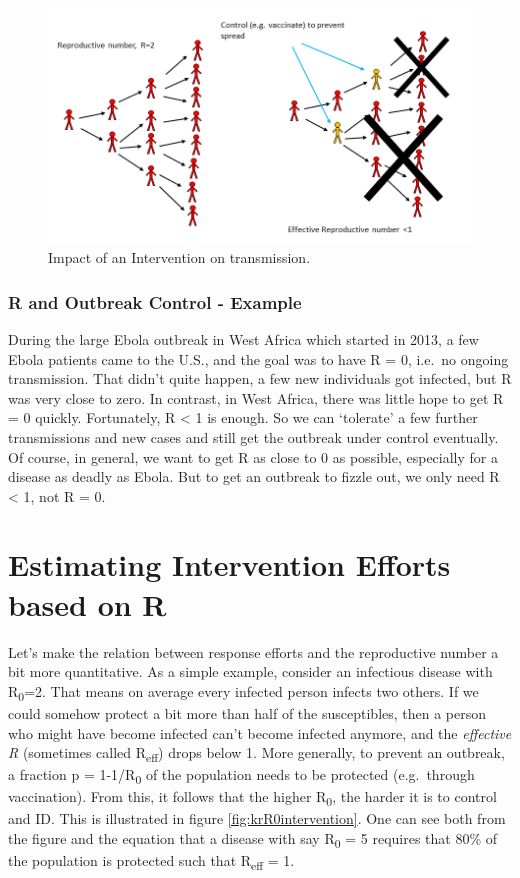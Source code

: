 \documentclass[]{book}
\theoremstyle{definition}
\theoremstyle{definition}
\theoremstyle{definition}
\theoremstyle{remark}
\begin{document}
\begin{figure}
\centering
\includegraphics{./images/R0intervention.png}
\caption{\label{fig:R0intervention}Impact of an Intervention on
transmission.}
\end{figure}

\subsubsection{R and Outbreak Control - Example}\label{myexamplebox}

During the large Ebola outbreak in West Africa which started in 2013, a
few Ebola patients came to the U.S., and the goal was to have R = 0,
i.e.~no ongoing transmission. That didn't quite happen, a few new
individuals got infected, but R was very close to zero. In contrast, in
West Africa, there was little hope to get R = 0 quickly. Fortunately, R
\textless{} 1 is enough. So we can `tolerate' a few further
transmissions and new cases and still get the outbreak under control
eventually. Of course, in general, we want to get R as close to 0 as
possible, especially for a disease as deadly as Ebola. But to get an
outbreak to fizzle out, we only need R \textless{} 1, not R = 0.

\section{Estimating Intervention Efforts based on
R}\label{estimating-intervention-efforts-based-on-r}

Let's make the relation between response efforts and the reproductive
number a bit more quantitative. As a simple example, consider an
infectious disease with R\textsubscript{0}=2. That means on average
every infected person infects two others. If we could somehow protect a
bit more than half of the susceptibles, then a person who might have
become infected can't become infected anymore, and the \emph{effective
R} (sometimes called R\textsubscript{eff}) drops below 1. More
generally, to prevent an outbreak, a fraction p = 1-1/R\textsubscript{0}
of the population needs to be protected (e.g.~through vaccination). From
this, it follows that the higher R\textsubscript{0}, the harder it is to
control and ID. This is illustrated in figure
\ref{fig:krR0intervention}. One can see both from the figure and the
equation that a disease with say R\textsubscript{0} = 5 requires that
80\% of the population is protected such that R\textsubscript{eff} = 1.
\end{document}
